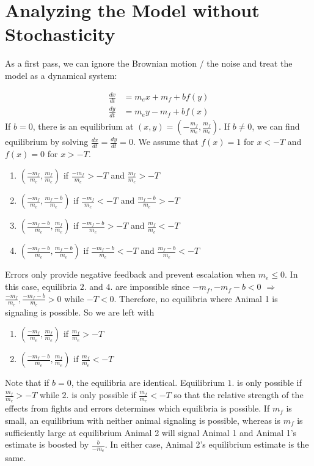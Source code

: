 \documentclass{article}
\begin{document}
\section{Analyzing the Model without Stochasticity }
As a first pass, we can ignore the Brownian motion / the noise and treat the model as a dynamical system:

\begin{align*}
\frac{dx}{dt}&=m_ex+m_f+bf(y)
\\ \frac{dy}{dt}&=m_ey-m_f+bf(x)
\end{align*}
If $b=0$, there is an equilibrium at $(x,y)=\left(-\frac{m_f}{m_e},\frac{m_f}{m_e}\right).$  If $b\neq 0$, we can find equilibrium by solving $\frac{dx}{dt}=\frac{dy}{dt}=0$.  We assume that $f(x)=1$ for $x<-T$ and $f(x)=0$ for $x>-T$.
\begin{enumerate}
\item $\left(\frac{-m_f}{m_e},\frac{m_f}{m_e}\right)$ if $\frac{-m_f}{m_e}>-T$ and $\frac{m_f}{m_e}>-T$
\item $\left(\frac{-m_f}{m_e},\frac{m_f-b}{m_e}\right)$ if $\frac{-m_f}{m_e}<-T$ and $\frac{m_f-b}{m_e}>-T$
\item $\left(\frac{-m_f-b}{m_e},\frac{m_f}{m_e}\right)$ if $\frac{-m_f-b}{m_e}>-T$ and $\frac{m_f}{m_e}<-T$
\item $\left(\frac{-m_f-b}{m_e},\frac{m_f-b}{m_e}\right)$ if $\frac{-m_f-b}{m_e}<-T$ and $\frac{m_f-b}{m_e}<-T$
\end{enumerate}
Errors only provide negative feedback and prevent escalation when $m_e\leq 0$.  In this case, equilibria $2.$ and $4.$ are impossible since $-m_f,-m_f-b<0$ $\Rightarrow$ $\frac{-m_f}{m_e},\frac{-m_f-b}{m_e}>0$ while $-T<0$.  Therefore, no equilibria where Animal 1 is signaling is possible.  So we are left with 
\begin{enumerate}
\item $\left(\frac{-m_f}{m_e},\frac{m_f}{m_e}\right)$ if $\frac{m_f}{m_e}>-T$
\item $\left(\frac{-m_f-b}{m_e},\frac{m_f}{m_e}\right)$ if $\frac{m_f}{m_e}<-T$
\end{enumerate}
Note that if $b=0$, the equilibria are identical.  Equilibrium $1.$ is only possible if $\frac{m_f}{m_e}>-T$ while $2.$ is only possible if $\frac{m_f}{m_e}<-T$ so that the relative strength of the effects from fights and errors determines which equilibria is possible.  If $m_f$ is small, an equilibrium with neither animal signaling is possible, whereas is $m_f$ is sufficiently large at equilibrium Animal 2 will signal Animal 1 and Animal 1's estimate is boosted by $\frac{b}{-m_e}$.  In either case, Animal 2's equilibrium estimate is the same.
\end{document}
